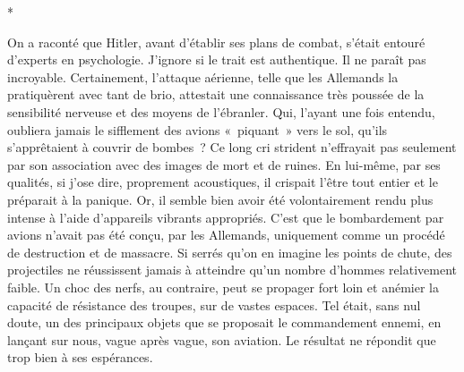 \documentclass[french,twoside]{book} %
\begin{document}
\begin{center}
*\end{center}
\noindent On a raconté que Hitler, avant d’établir ses plans de combat, s’était entouré d’experts en psychologie. J’ignore si le trait est authentique. Il ne paraît pas incroyable. Certainement, l’attaque aérienne, telle que les Allemands la pratiquèrent avec tant de brio, attestait une connaissance très poussée de la sensibilité nerveuse et des moyens de l’ébranler. Qui, l’ayant une fois entendu, oubliera jamais le sifflement des avions « piquant » vers le sol, qu’ils s’apprêtaient à couvrir de bombes ? Ce long cri strident n’effrayait pas seulement par son association avec des images de mort et de ruines. En lui-même, par ses qualités, si j’ose dire, proprement acoustiques, il crispait l’être tout entier et le préparait à la panique. Or, il semble bien avoir été volontairement rendu plus intense à l’aide d’appareils vibrants appropriés. C’est que le bombardement par avions n’avait pas été conçu, par les Allemands, uniquement comme un procédé de destruction et de massacre. Si serrés qu’on en imagine les points de chute, des projectiles   ne réussissent jamais à atteindre qu’un nombre d’hommes relativement faible. Un choc des nerfs, au contraire, peut se propager fort loin et anémier la capacité de résistance des troupes, sur de vastes espaces. Tel était, sans nul doute, un des principaux objets que se proposait le commandement ennemi, en lançant sur nous, vague après vague, son aviation. Le résultat ne répondit que trop bien à ses espérances.\par
\end{document}
